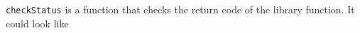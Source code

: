 \documentclass{article}
\newcommand{\OM}{{\sl OpenMath}}
\begin{document}
{\tt checkStatus} is a function that checks the return code of the library
function. It could look like


%
%
%
%
%
%
%
%

%
%
%
%
\end{document}
